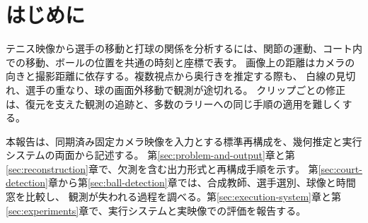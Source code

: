 \section{はじめに}
\label{sec:introduction}

テニス映像から選手の移動と打球の関係を分析するには、関節の運動、コート内での移動、ボールの位置を共通の時刻と座標で表す。
画像上の距離はカメラの向きと撮影距離に依存する。複数視点から奥行きを推定する際も、
白線の見切れ、選手の重なり、球の画面外移動で観測が途切れる。
クリップごとの修正は、復元を支えた観測の追跡と、多数のラリーへの同じ手順の適用を難しくする。

本報告は、同期済み固定カメラ映像を入力とする標準再構成を、幾何推定と実行システムの両面から記述する。
第\ref{sec:problem-and-output}章と第\ref{sec:reconstruction}章で、欠測を含む出力形式と再構成手順を示す。
第\ref{sec:court-detection}章から第\ref{sec:ball-detection}章では、合成教師、選手選別、球像と時間窓を比較し、
観測が失われる過程を調べる。第\ref{sec:execution-system}章と第\ref{sec:experiments}章で、実行システムと実映像での評価を報告する。
